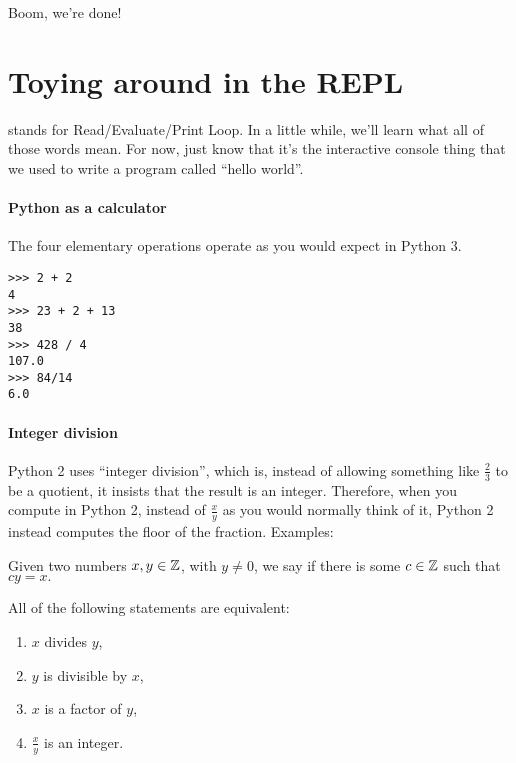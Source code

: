Boom, we're done!

\section{Toying around in the REPL}

 stands for Read/Evaluate/Print Loop. In a little while,
we'll learn what all of those words mean. For now, just know that it's
the interactive console thing that we used to write a program called
``hello world''.

\paragraph{Python as a calculator}

The four elementary operations operate as you would expect in Python
3.

\begin{lstlisting}
>>> 2 + 2
4
>>> 23 + 2 + 13
38
>>> 428 / 4
107.0
>>> 84/14
6.0
\end{lstlisting}

\paragraph{Integer division} Python 2 uses ``integer division'', which
is, instead of allowing something like $\frac{2}{3}$ to be a quotient,
it insists that the result is an integer. Therefore, when you compute
 in Python 2, instead of $\frac{x}{y}$ as you would
normally think of it, Python 2 instead computes the floor of the
fraction.   Examples:

\begin{definition}
  Given two numbers $x, y \in \mathbb{Z}$, with $y \ne 0$, we say  if there is some $c \in \mathbb{Z}$ such that $cy = x.$
\end{definition}

\begin{remark}
  All of the following statements are equivalent:

  \begin{enumerate}
  \item $x$ divides $y$,
  \item $y$ is divisible by $x$,
  \item $x$ is a factor of $y$,
  \item $\frac{x}{y}$ is an integer.
  \end{enumerate}
\end{remark}

